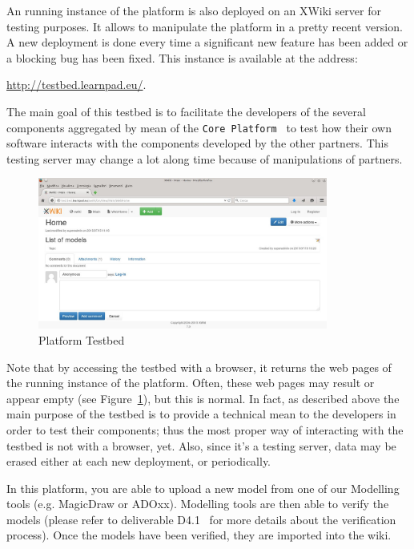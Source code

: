 \documentclass{learnpad}
\begin{document}
An running instance of the \learnpad platform is also deployed on an XWiki 
server for testing purposes.  It allows to manipulate the platform in a pretty 
recent version.  A new deployment is done every time a significant new feature 
has been added or a blocking bug has been fixed. This instance is available 
at the address:

\url{http://testbed.learnpad.eu/}.

The main goal of this testbed is to facilitate the developers of the several 
components aggregated by mean of the \texttt{\learnpad Core 
Platform}~\cite{learnpad:D2.1} to test how their own software interacts with 
the components developed by the other partners. This testing server may change a 
lot along time because of manipulations of partners.  

\begin{figure}[h!]
 \centering
 \includegraphics[width=0.85\textwidth]{./Figures/testbed.jpg}
 \caption{\learnpad Platform Testbed}
 \label{fig:testbed}
\end{figure}

Note that by accessing the testbed with a browser, it returns the 
web pages of the running instance of the platform. Often, these web pages may 
result or appear empty (see Figure~\ref{fig:testbed}), but this is normal.
In fact, as described above the main purpose of the testbed is to provide
a technical mean to the developers in order to test their components; thus the 
most proper way of interacting with the testbed is not with a browser, yet.
Also, since it's a testing server, data may be erased either at each new
deployment, or periodically.

In this platform, you are able to upload a new model from one of our Modelling
tools (e.g. MagicDraw or ADOxx).  Modelling tools are then able to verify the 
models (please refer to deliverable D4.1~\cite{learnpad:D4.1} for more details 
about the verification process). Once the models have been verified, they are 
imported into the wiki.
\end{document}
